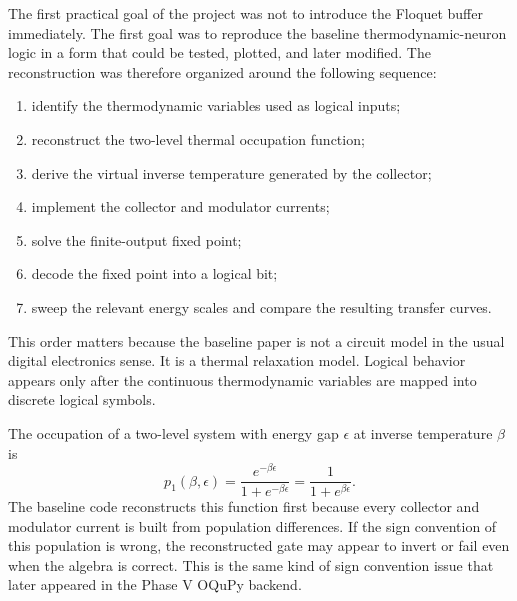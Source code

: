 \documentclass[11pt]{article}
\begin{document}
The first practical goal of the project was not to introduce the Floquet buffer immediately.
The first goal was to reproduce the baseline thermodynamic-neuron logic in a form that could
be tested, plotted, and later modified.  The reconstruction was therefore organized around
the following sequence:
\begin{enumerate}[label=(\roman*)]
    \item identify the thermodynamic variables used as logical inputs;
    \item reconstruct the two-level thermal occupation function;
    \item derive the virtual inverse temperature generated by the collector;
    \item implement the collector and modulator currents;
    \item solve the finite-output fixed point;
    \item decode the fixed point into a logical bit;
    \item sweep the relevant energy scales and compare the resulting transfer curves.
\end{enumerate}
This order matters because the baseline paper is not a circuit model in the usual digital
electronics sense.  It is a thermal relaxation model.  Logical behavior appears only after
the continuous thermodynamic variables are mapped into discrete logical symbols.

The occupation of a two-level system with energy gap $\epsilon$ at inverse temperature
$\beta$ is
\begin{equation}
    p_1(\beta,\epsilon)
    =
    \frac{e^{-\beta\epsilon}}{1+e^{-\beta\epsilon}}
    =
    \frac{1}{1+e^{\beta\epsilon}} .
\end{equation}
The baseline code reconstructs this function first because every collector and modulator
current is built from population differences.  If the sign convention of this population is
wrong, the reconstructed gate may appear to invert or fail even when the algebra is correct.
This is the same kind of sign convention issue that later appeared in the Phase V OQuPy
backend.
\end{document}

